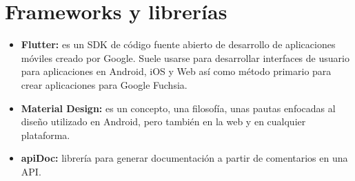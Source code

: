 \section{Frameworks y librerías}
		
		\begin{itemize}
		
			\item \textbf{Flutter:} es un SDK de código fuente abierto de desarrollo de aplicaciones móviles creado por Google. Suele usarse para desarrollar interfaces de usuario para aplicaciones en Android, iOS y Web así como método primario para crear aplicaciones para Google Fuchsia.
			
			\item \textbf{Material Design:} es un concepto, una filosofía, unas pautas enfocadas al diseño utilizado en Android, pero también en la web y en cualquier plataforma.

			\item \textbf{apiDoc:} librería para generar documentación a partir de comentarios en una API.
			
		\end{itemize}

	